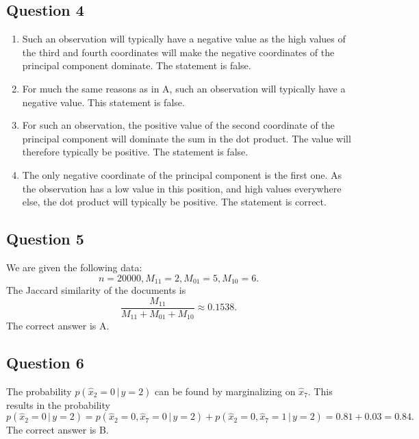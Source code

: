 \documentclass[twoside,11pt]{article}
\begin{document}
\subsection*{Question 4}

\begin{enumerate}[label=\Alph*.]
	\item Such an observation will typically have a negative value as the high values of the third and fourth coordinates will make the negative coordinates of the principal component dominate. The statement is false.

	\item For much the same reasons as in A, such an observation will typically have a negative value. This statement is false.

	\item For such an observation, the positive value of the second coordinate of the principal component will dominate the sum in the dot product. The value will therefore typically be positive. The statement is false.

	\item The only negative coordinate of the principal component is the first one. As the observation has a low value in this position, and high values everywhere else, the dot product will typically be positive. The statement is correct.
	\end{enumerate}

\subsection*{Question 5}

We are given the following data:
\[
	n = 20000, M_{11} = 2, M_{01} = 5, M_{10} = 6.
\]
The Jaccard similarity of the documents is
\[
	\frac{M_{11}}{M_{11} + M_{01} + M_{10}} \approx 0.1538.
\]
The correct answer is A.

\subsection*{Question 6}

The probability \(p(\hat{x}_2 = 0 \, | \, y = 2)\) can be found by marginalizing on \(\hat{x}_7\). This results in the probability
\[
	p(\hat{x}_2 = 0 \, | \, y = 2) = p(\hat{x}_2 = 0, \hat{x}_7 = 0 \, | \, y = 2)
	+ p(\hat{x}_2 = 0, \hat{x}_7 = 1 \, | \, y = 2) = 0.81 + 0.03 = 0.84.
\]
The correct answer is B.




\end{document}
